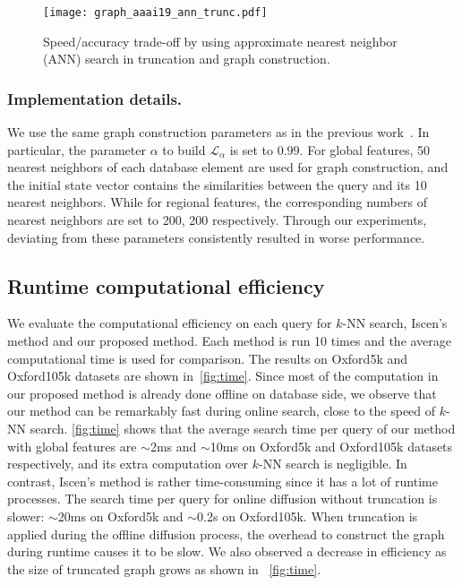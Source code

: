 \documentclass[letterpaper]{article} \usepackage{aaai19}  \usepackage{times}  \usepackage{helvet}  \usepackage{courier}  \usepackage{url}  \usepackage{graphicx}  \frenchspacing  \setlength{\pdfpagewidth}{8.5in}  \setlength{\pdfpageheight}{11in}
\begin{document}
\begin{figure}[t]
  \centering
  \texttt{[image: graph\_aaai19\_ann\_trunc.pdf]}
  \caption{Speed/accuracy trade-off by using approximate nearest neighbor (ANN) search in truncation and graph construction.}
  \label{fig:offline}
\vspace{-3mm}
\end{figure}


\subsubsection{Implementation details.}
We use the same graph construction parameters as in the previous work~\cite{iscen2017efficient}.
In particular, the parameter $\alpha$ to build $\mathcal{L}_\alpha$ is set to $0.99$.
For global features, 50 nearest neighbors of each database element are used for graph construction, and the initial state vector contains the similarities between the query and its 10 nearest neighbors.
While for regional features, the corresponding numbers of nearest neighbors are set to 200, 200 respectively.
Through our experiments, deviating from these parameters consistently resulted in worse performance.

\subsection{Runtime computational efficiency}

We evaluate the computational efficiency on each query for $k$-NN search, Iscen's method and our proposed method.
Each method is run 10 times and the average computational time is used for comparison.
The results on Oxford5k and Oxford105k datasets are shown in~\cref{fig:time}.
Since most of the computation in our proposed method is already done offline on database side, we observe that our method can be remarkably fast during online search, close to the speed of $k$-NN search.
\cref{fig:time} shows that the average search time per query of our method with global features are $\sim$2ms and $\sim$10ms on Oxford5k and Oxford105k datasets respectively, and its extra computation over $k$-NN search is negligible.
In contrast, Iscen's method is rather time-consuming since it has a lot of runtime processes.
The search time per query for online diffusion without truncation is slower: $\sim$20ms on Oxford5k and $\sim$0.2s on Oxford105k.
When truncation is applied during the offline diffusion process, the overhead to construct the graph during runtime causes it to be slow. We also observed a decrease in efficiency as the size of truncated graph grows as shown in ~\cref{fig:time}.
\end{document}
